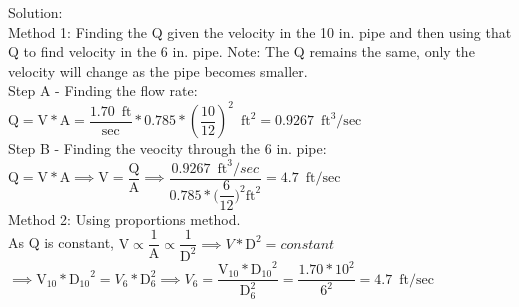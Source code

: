 \documentclass{article}
\begin{document}
\begin{enumerate}
\vspace{0.3cm}
Solution:\\
\vspace{0.3cm}
Method 1: Finding the Q given the velocity in the 10 in. pipe and then using that Q to find velocity in the 6 in. pipe.  Note:  The Q remains the same, only the velocity will change as the pipe becomes smaller.\\
\vspace{0.3cm}
Step A - Finding the flow rate:\\
\vspace{0.3cm}
$\mathrm{Q}=\mathrm{V}*\mathrm{A}= \dfrac{1.70 \enspace \mathrm{ft}}{\mathrm{sec}}*0.785*(\dfrac{10}{12})^2 \enspace \mathrm{ft}^2=0.9267 \enspace \mathrm{ft}^3/\mathrm{sec}$\\
\vspace{0.3cm}
Step B - Finding the veocity through the 6 in. pipe:\\
\vspace{0.3cm}
$\mathrm{Q}=\mathrm{V}*\mathrm{A} \implies \mathrm{V}= \dfrac{\mathrm{Q}}{\mathrm{A}} \implies  \dfrac{0.9267 \enspace \mathrm{ft}^3/sec}{0.785*\Big(\dfrac{6}{12}\Big)^2 \mathrm{ft}^2}=\boxed{4.7 \enspace \mathrm{ft/sec}}$\\
\vspace{0.3cm}
Method 2: Using proportions method.\\
\vspace{0.3cm}
As Q is constant, $\mathrm{V} \propto \dfrac{1}{\mathrm{A}} \propto \dfrac{1}{\mathrm{D}^2} \implies V*\mathrm{D}^2=constant$\\
\vspace{0.3cm}
$\implies \mathrm{V}_{10}*\mathrm{D_{10}}^2=  V_{6}*\mathrm{D}_{6}^2 \implies V_{6} = \dfrac{\mathrm{V}_{10}*\mathrm{D_{10}}^2}{\mathrm{D}_{6}^2} = \dfrac{1.70*10^2}{6^2}=\boxed{4.7 \enspace \mathrm{ft/sec}}$



\end{enumerate}
\end{document}
